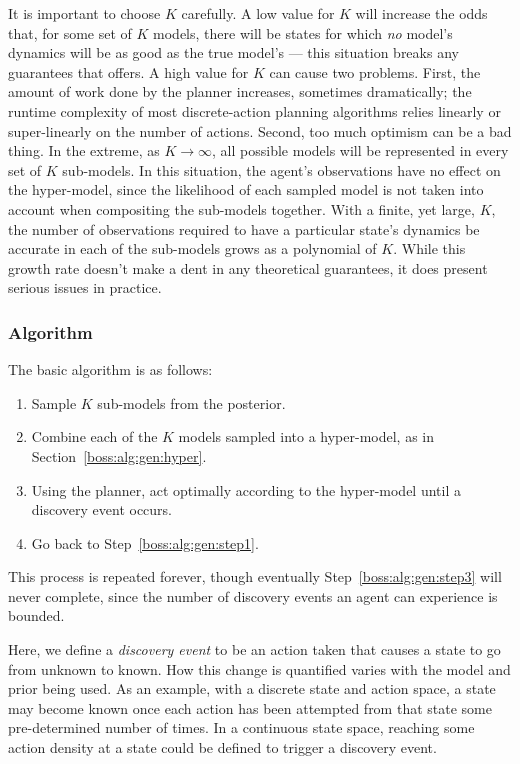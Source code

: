It is important to choose $K$ carefully. A low value for $K$ will increase the odds that, for some set of $K$ models, there will be states for which \emph{no} model's dynamics will be as good as the true model's --- this situation breaks any guarantees that  offers. A high value for $K$ can cause two problems. First, the amount of work done by the planner increases, sometimes dramatically; the runtime complexity of most discrete-action planning algorithms relies linearly or super-linearly on the number of actions. Second, too much optimism can be a bad thing. In the extreme, as $K \rightarrow \infty$, all possible models will be represented in every set of $K$ sub-models. In this situation, the agent's observations have no effect on the hyper-model, since the likelihood of each sampled model is not taken into account when compositing the sub-models together. With a finite, yet large, $K$, the number of observations required to have a particular state's dynamics be accurate in each of the sub-models grows as a polynomial of $K$. While this growth rate doesn't make a dent in any theoretical guarantees, it does present serious issues in practice.

\subsubsection{Algorithm}

The basic  algorithm is as follows:
\begin{enumerate}
\item Sample $K$ sub-models from the posterior. \label{boss:alg:gen:step1}
\item Combine each of the $K$ models sampled into a hyper-model, as in Section~\ref{boss:alg:gen:hyper}.
\item Using the planner, act optimally according to the hyper-model until a discovery event occurs. \label{boss:alg:gen:step3}
\item Go back to Step~\ref{boss:alg:gen:step1}.
\end{enumerate}

This process is repeated forever, though eventually Step~\ref{boss:alg:gen:step3} will never complete, since the number of discovery events an agent can experience is bounded.

Here, we define a \emph{discovery event} to be an action taken that causes a state to go from unknown to known. How this change is quantified varies with the model and prior being used. As an example, with a discrete state and action space, a state may become known once each action has been attempted from that state some pre-determined number of times. In a continuous state space, reaching some action density at a state could be defined to trigger a discovery event.

